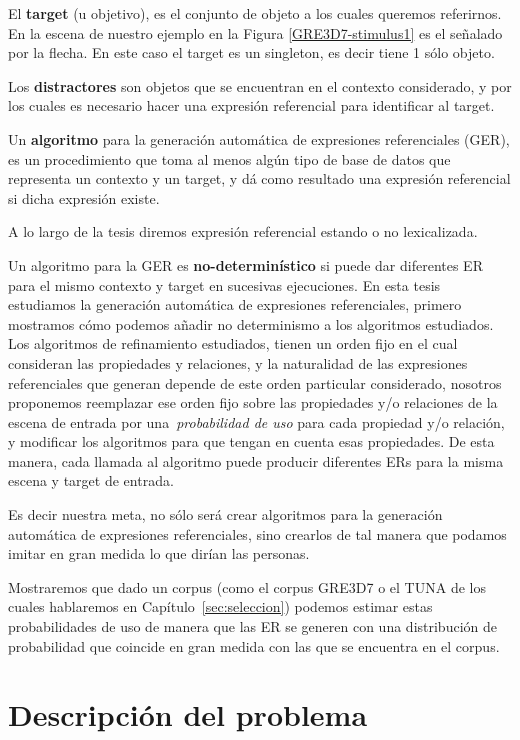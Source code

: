 El {\bf target} (u objetivo), es el conjunto de objeto a los cuales queremos referirnos. En la escena de nuestro ejemplo en la Figura \ref{GRE3D7-stimulus1} es el se\~nalado por la flecha. En este caso el target es un singleton, es decir tiene 1 s\'olo objeto.

Los {\bf distractores} son objetos que se encuentran en el contexto considerado, y por los cuales es necesario hacer una expresi\'on referencial para identificar al target. 

Un {\bf algoritmo} para la generaci\'on autom\'atica de expresiones referenciales (GER), es un procedimiento que toma al menos alg\'un tipo de base de datos que representa un contexto y un target, y d\'a como resultado una expresi\'on referencial si dicha expresi\'on existe.

A lo largo de la tesis diremos expresi\'on referencial estando o no lexicalizada.

Un algoritmo para la GER es {\bf no-determin\'istico} si puede dar diferentes ER para el mismo contexto y target en sucesivas ejecuciones.
En esta tesis estudiamos la generaci\'on autom\'atica de expresiones referenciales, 
primero mostramos c\'omo podemos a\~nadir no determinismo a los algoritmos estudiados. Los algoritmos de refinamiento estudiados, tienen un orden fijo en el cual consideran las propiedades y relaciones, y la naturalidad de las expresiones referenciales que generan depende de este orden particular considerado, nosotros proponemos reemplazar ese orden fijo sobre las propiedades y/o relaciones de la escena de entrada por una~\emph{probabilidad de uso} para cada propiedad y/o relaci\'on, y modificar los algoritmos para que tengan en cuenta esas propiedades. De esta manera, cada llamada al algoritmo puede producir diferentes ERs para la misma escena y target de entrada. 

Es decir nuestra meta, no s\'olo ser\'a crear algoritmos para la generaci\'on autom\'atica de expresiones referenciales, sino crearlos de tal manera que podamos imitar en gran medida lo que dir\'ian las personas.

Mostraremos que dado un corpus (como el corpus GRE3D7 o el TUNA de los cuales hablaremos en Cap\'itulo~\ref{sec:seleccion}) podemos estimar estas probabilidades de uso de manera que las ER se generen con una distribuci\'on de probabilidad que coincide en gran medida con las que se encuentra en el corpus.




\section{Descripci\'on del problema}
\label{sec:problema}

